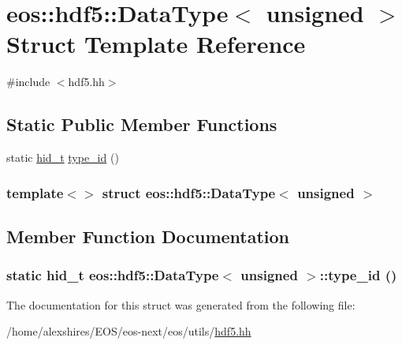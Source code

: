 \hypertarget{structeos_1_1hdf5_1_1DataType_3_01unsigned_01_4}{
\section{eos::hdf5::DataType$<$ unsigned $>$ Struct Template Reference}
\label{structeos_1_1hdf5_1_1DataType_3_01unsigned_01_4}
}


{\ttfamily \#include $<$hdf5.hh$>$}\subsection*{Static Public Member Functions}
\begin{DoxyCompactItemize}
\item 
static \hyperlink{namespaceeos_1_1hdf5_a5bd5e209f1bf36cdc5551465dacf2e74}{hid\_\-t} \hyperlink{structeos_1_1hdf5_1_1DataType_3_01unsigned_01_4_a8bc8ca9f5f6ba523da948d0babc6168c}{type\_\-id} ()
\end{DoxyCompactItemize}
\subsubsection*{template$<$$>$ struct eos::hdf5::DataType$<$ unsigned $>$}



\subsection{Member Function Documentation}
\hypertarget{structeos_1_1hdf5_1_1DataType_3_01unsigned_01_4_a8bc8ca9f5f6ba523da948d0babc6168c}{
\subsubsection[{type\_\-id}]{\setlength{\rightskip}{0pt plus 5cm}static {\bf hid\_\-t} {\bf eos::hdf5::DataType}$<$ unsigned $>$::type\_\-id ()}}
\label{structeos_1_1hdf5_1_1DataType_3_01unsigned_01_4_a8bc8ca9f5f6ba523da948d0babc6168c}


The documentation for this struct was generated from the following file:\begin{DoxyCompactItemize}
\item 
/home/alexshires/EOS/eos-\/next/eos/utils/\hyperlink{hdf5_8hh}{hdf5.hh}\end{DoxyCompactItemize}
